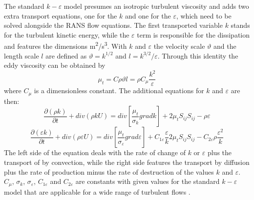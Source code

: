 The standard $k-\varepsilon$ model presumes an isotropic turbulent viscosity and adds two extra transport equations, one for the $k$ and one for the $\varepsilon$, which need to be solved alongside the RANS flow equations.
The first transported variable $k$ stands for the turbulent kinetic energy, while the $\varepsilon$ term is responsible for the dissipation and features the dimensions m\textsuperscript{2}/s\textsuperscript{3}.
With $k$ and $\varepsilon$ the velocity scale $\vartheta$ and the length scale $l$ are defined as $\vartheta = k^{1/2}$ and $l = k^{3/2}/\varepsilon$. Through this identity the eddy viscosity can be obtained by
\begin{equation}
\mu_t = C \rho \vartheta l = \rho C_{\mu} \frac{k^2}{\varepsilon}
\end{equation}
where $C_{\mu}$ is a dimensionless constant. The additional equations for $k$ and $\varepsilon$ are then:
\begin{equation}
\frac{\partial(\rho k)}{\partial t} + div(\rho k U) = div \left[ \frac{\mu_t}{\sigma_k} grad k \right] + 2 \mu_t S_{ij} S_{ij} - \rho \varepsilon
\end{equation}
\begin{equation}
\frac{\partial(\varepsilon k)}{\partial t} + div(\rho \varepsilon U) = div \left[ \frac{\mu_t}{\sigma_{\varepsilon}} grad \varepsilon \right] + C_{1\varepsilon} \frac{\varepsilon}{k} 2 \mu_t S_{ij} S_{ij} - C_{2\varepsilon} \rho \frac{\varepsilon^2}{k}
\end{equation}
The left side of the equation deals with the rate of change of $k$ or $\varepsilon$ plus the transport of by convection, while the right side features the transport by diffusion plus the rate of production minus the rate of destruction of the values $k$ and $\varepsilon$.
$C_{\mu}$, $\sigma_k$, $\sigma_{\varepsilon}$, $C_{1\varepsilon}$ and $C_{2\varepsilon}$ are constants with given values for the standard $k-\varepsilon$ model that are applicable for a wide range of turbulent flows \cite{versteeg}.

